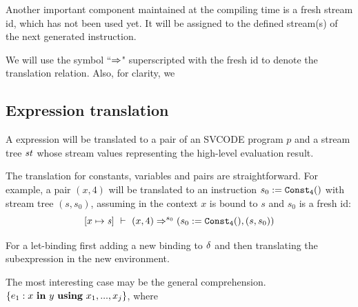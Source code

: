 Another important component maintained at the compiling time is a fresh stream id, which has not been used yet. 
It will be assigned to the defined stream(s) of the next generated instruction.

We will use the symbol ``$\Rightarrow$" superscripted with the fresh id to denote the translation relation. 
Also, for clarity, we

\subsection{Expression translation}

A \mysnesl expression will be translated to a pair of an SVCODE program $p$ and a stream tree $\mathit{st}$ whose stream values representing the high-level evaluation result.

The translation for constants, variables and pairs are straightforward. For example, a pair $(x,4)$ will be translated to an instruction $s_0 := \mathtt{Const_{4}()}$ with stream tree $(s,s_0)$, assuming in the context $x$ is bound to $s$ and $s_0$ is a fresh id:   
$$[x \|-> \s] \Env (x,4)  \Ra^{s_0} (s_0 := \constaf{4}, (s,s_0))$$ 

For a let-binding  first adding a new binding to $\delta$ and then translating the subexpression in the new environment.

The most interesting case may be the general comprehension.
$\{e_1 : x \ \mathbf{in} \ y \ \mathbf{using} \ x_1,...,x_j\}$, where 



	

